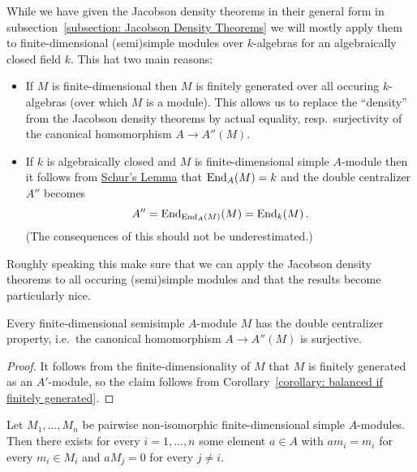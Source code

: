 \begin{fluff}
  While we have given the Jacobson density theorems in their general form in subsection~\ref{subsection: Jacobson Density Theorems} we will mostly apply them to finite-dimensional (semi)simple modules over $k$-algebras for an algebraically closed field $k$.
  This hat two main reasons:
  \begin{itemize}
    \item
      If $M$ is finite-dimensional then $M$ is finitely generated over all occuring $k$-algebras (over which $M$ is a module).
      This allows us to replace the \enquote{density} from the Jacobson density theorems by actual equality, resp.\ surjectivity of the canonical homomorphism $A \to A''(M)$.
    \item
      If $k$ is algebraically closed and $M$ is finite-dimensional simple $A$-module then it follows from \hyperref[proposition: schurs lemma for modules]{Schur’s Lemma} that $\operatorname{End}_A(M) = k$ and the double centralizer $A''$ becomes
      \[
          A''
        = \operatorname{End}_{\operatorname{End}_A(M)}(M)
        = \operatorname{End}_k(M) \,.
      \]
      (The consequences of this should not be underestimated.)
  \end{itemize}
  Roughly speaking this make sure that we can apply the Jacobson density theorems to all occuring (semi)simple modules and that the results become particularly nice.
\end{fluff}


\begin{lemma}
  \label{lemma: fd balanced are ss}
  Every finite-dimensional semisimple $A$-module $M$ has the double centralizer property, i.e.\ the canonical homomorphism $A \to A''(M)$ is surjective.
\end{lemma}


\begin{proof}
  It follows from the finite-dimensionality of $M$ that $M$ is finitely generated as an $A'$-module, so the claim follows from Corollary~\ref{corollary: balanced if finitely generated}.
\end{proof}


\begin{corollary}
  \label{corollary: existence of projection operators}
  Let $M_1, \dotsc, M_n$ be pairwise non-isomorphic finite-dimensional simple $A$-modules.
  Then there exists for every $i = 1, \dotsc, n$ some element $a \in A$ with $a m_i = m_i$ for every $m_i \in M_i$ and $a M_j = 0$ for every $j \neq i$.
\end{corollary}



